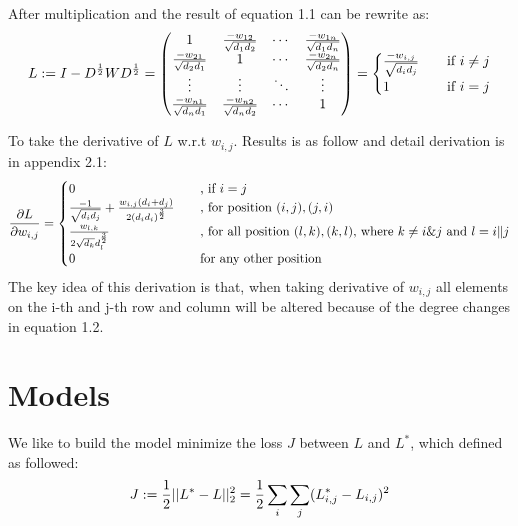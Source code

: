 \documentclass[final]{siamltexmm}
\begin{document}
After multiplication and the result of equation 1.1 can be rewrite as:
\begin{equation}
L := I - D^{1 \over 2}W D^{1 \over 2} =
\begin{pmatrix}
  1 & {-w_{12} \over \sqrt{d_1d_2}} & \cdots & {-w_{1n} \over \sqrt{d_1d_n}} \\
  {-w_{21} \over \sqrt{d_2d_1}} & 1 & \cdots & {-w_{2n} \over \sqrt{d_2d_n}} \\
  \vdots  & \vdots  & \ddots & \vdots  \\
  {-w_{n1} \over \sqrt{d_nd_1}} & {-w_{n2} \over \sqrt{d_nd_2}} & \cdots & 1 \\
\end{pmatrix}
=
\begin{cases}
  {-w_{i,j} \over \sqrt{d_id_j}}       & \quad \text{if } i \neq j\\
  1   & \quad \text{if } i = j\\
\end{cases}
\end{equation}

To take the derivative of $L$ w.r.t $w_{i,j}$. Results is as follow and detail derivation is in appendix 2.1:
\begin{equation}
{\partial L \over \partial w_{i,j}} =
\begin{cases}
  0       & \quad \text{, if $i = j$}\\
  {-1 \over \sqrt{d_id_j}} + {w_{i,j}(d_i+d_j) \over 2(d_id_i)^{3\over 2}} & \quad \text{, for position $(i,j), (j,i)$} \\
  {w_{l,k} \over 2\sqrt{d_k}d_l^{3\over2}}       & \quad \text{, for all position $(l,k), (k,l)$, where $k \neq i \& j$ and $l = i\|j$}\\
  0 & \quad \text{for any other position} \\
\end{cases}
\end{equation}
The key idea of this derivation is that, when taking derivative of $w_{i,j}$ all elements on the i-th and j-th row and column will be altered because of the degree changes in equation 1.2.

\section{Models}
We like to build the model minimize the loss $J$ between $L$ and $L^{\ast}$, which defined as followed:
\begin{equation}
J := {1 \over 2} || L^{\ast} - L ||^2_2
=
{1 \over 2}
\sum_{\substack{i}}
\sum_{\substack{j}}
(L^{\ast}_{i,j} - L_{i,j})^2
\end{equation}
\end{document}
